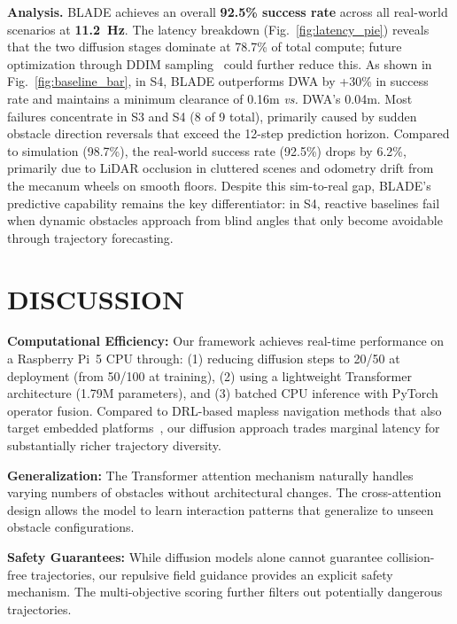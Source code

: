 \documentclass[letterpaper, 10 pt, conference]{ieeeconf}
\begin{document}
\textbf{Analysis.} BLADE achieves an overall \textbf{92.5\% success rate} across all real-world scenarios at \textbf{11.2~Hz}. The latency breakdown (Fig.~\ref{fig:latency_pie}) reveals that the two diffusion stages dominate at 78.7\% of total compute; future optimization through DDIM sampling~\cite{song2020score} could further reduce this. As shown in Fig.~\ref{fig:baseline_bar}, in S4, BLADE outperforms DWA by +30\% in success rate and maintains a minimum clearance of 0.16m \textit{vs.} DWA's 0.04m. Most failures concentrate in S3 and S4 (8 of 9 total), primarily caused by sudden obstacle direction reversals that exceed the 12-step prediction horizon. Compared to simulation (98.7\%), the real-world success rate (92.5\%) drops by 6.2\%, primarily due to LiDAR occlusion in cluttered scenes and odometry drift from the mecanum wheels on smooth floors. Despite this sim-to-real gap, BLADE's predictive capability remains the key differentiator: in S4, reactive baselines fail when dynamic obstacles approach from blind angles that only become avoidable through trajectory forecasting.

\section{DISCUSSION}

\textbf{Computational Efficiency:} Our framework achieves real-time performance on a Raspberry Pi~5 CPU through: (1) reducing diffusion steps to 20/50 at deployment (from 50/100 at training), (2) using a lightweight Transformer architecture (1.79M parameters), and (3) batched CPU inference with PyTorch operator fusion. Compared to DRL-based mapless navigation methods that also target embedded platforms~\cite{hu2024mapless}, our diffusion approach trades marginal latency for substantially richer trajectory diversity.

\textbf{Generalization:} The Transformer attention mechanism naturally handles varying numbers of obstacles without architectural changes. The cross-attention design allows the model to learn interaction patterns that generalize to unseen obstacle configurations.

\textbf{Safety Guarantees:} While diffusion models alone cannot guarantee collision-free trajectories, our repulsive field guidance provides an explicit safety mechanism. The multi-objective scoring further filters out potentially dangerous trajectories.
\end{document}
